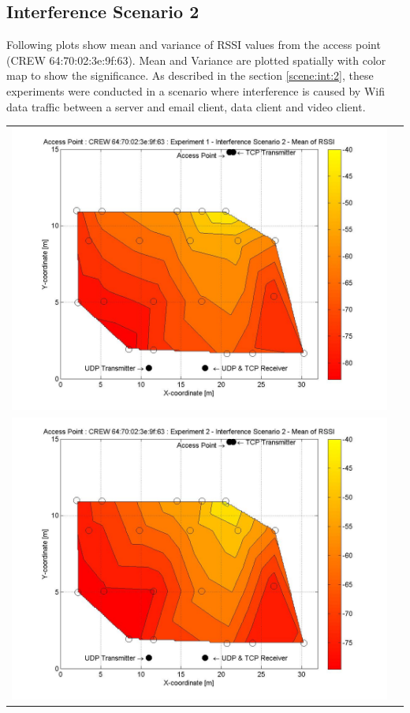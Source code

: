 \documentclass[11pt,a4paper,headinclude,footinclude,chapterprefix=on]{scrreprt}
\begin{document}
\subsection{Interference Scenario 2} 
Following plots show mean and variance of RSSI values from the access point (CREW 64:70:02:3e:9f:63). Mean and Variance are plotted spatially with color map to show the significance. As described in the section \ref{scene:int:2}, these experiments were conducted in a scenario where interference is caused by Wifi data traffic between a server and email client, data client and video client.
\begin{longtable}
	{lr} 
	\includegraphics[width=13cm]{../../Source/plot/CREW_63/63_Wifi_Ex_1_Mean.jpg} \\
	\includegraphics[width=13cm]{../../Source/plot/CREW_63/63_Wifi_Ex_2_Mean.jpg} \\

\end{longtable}
\end{document}
